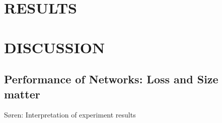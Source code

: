 \documentclass{article}
\begin{document}
\section{RESULTS}
\label{sec:illust}


%

%







%



\section{DISCUSSION}

\subsection{Performance of Networks: Loss and Size matter}
Søren: Interpretation of experiment results
\end{document}
